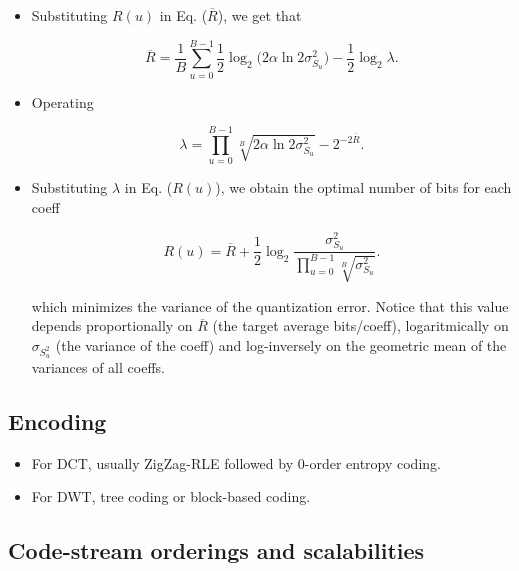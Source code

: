 \begin{itemize}
\item
  Substituting \(R(u)\) in Eq. (\(\overline{R}\)), we get that

  \begin{equation}
    \overline{R} = \frac{1}{B}\sum_{u=0}^{B-1}\frac{1}{2}\log_2\big( 2\alpha\ln 2\sigma_{S_u}^2 \big) - \frac{1}{2}\log_2\lambda.
  \end{equation}
\item
  Operating

  \begin{equation}
    \lambda = \prod_{u=0}^{B-1}\sqrt[B]{2\alpha\ln 2\sigma_{S_u}^2} - 2^{-2\overline{R}}.
  \end{equation}
\item
  Substituting \(\lambda\) in Eq. (\(R(u)\)), we obtain the optimal
  number of bits for each coeff

  \begin{equation}
    R(u) = \overline{R} + \frac{1}{2}\log_2\frac{\sigma_{S_u}^2}{\displaystyle\prod_{u=0}^{B-1}\sqrt[B]{\sigma_{S_u}^2}}.
  \end{equation}

  which minimizes the variance of the quantization error. Notice that
  this value depends proportionally on \(\overline{R}\) (the target
  average bits/coeff), logaritmically on \(\sigma_{S_u^2}\) (the
  variance of the coeff) and log-inversely on the geometric mean of the
  variances of all coeffs.
\end{itemize}

    \hypertarget{encoding}{%
\subsection{Encoding}\label{encoding}}

\begin{itemize}
\tightlist
\item
  For DCT, usually ZigZag-RLE followed by 0-order entropy coding.
\item
  For DWT, tree coding or block-based coding.
\end{itemize}

    \hypertarget{code-stream-orderings-and-scalabilities}{%
\subsection{Code-stream orderings and
scalabilities}\label{code-stream-orderings-and-scalabilities}}

